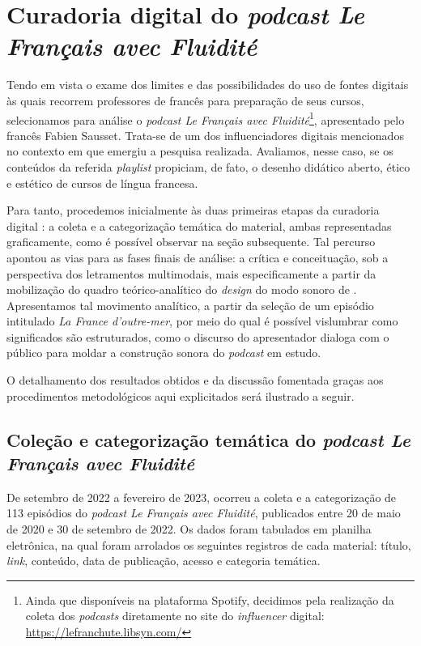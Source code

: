 \documentclass[portuguese]{textolivre}
\begin{document}
\section{Curadoria digital do \textit{podcast Le Français avec Fluidité}}\label{sec-normas}
Tendo em vista o exame dos limites e das possibilidades do uso de fontes digitais às quais recorrem professores de francês para preparação de seus cursos, selecionamos para análise o \textit{podcast Le Français avec Fluidité}\footnote{Ainda que disponíveis na plataforma Spotify, decidimos pela realização da coleta dos \textit{podcasts} diretamente no site do \textit{influencer} digital: \url{https://lefranchute.libsyn.com/}}, apresentado pelo francês Fabien Sausset. Trata-se de um dos influenciadores digitais mencionados no contexto em que emergiu a pesquisa realizada. Avaliamos, nesse caso, se os conteúdos da referida \textit{playlist} propiciam, de fato, o desenho didático aberto, ético e estético \cite{rocha_moocs_2019} de cursos de língua francesa.

Para tanto, procedemos inicialmente às duas primeiras etapas da curadoria digital \cite{deschaine_five_2015}: a coleta e a categorização temática do material, ambas representadas graficamente, como é possível observar na seção subsequente. Tal percurso apontou as vias para as fases finais de análise: a crítica e conceituação, sob a perspectiva dos letramentos multimodais, mais especificamente a partir da mobilização do quadro teórico-analítico do \textit{design} do modo sonoro de \textcite{kalantzis_letramentos_2020}. Apresentamos tal movimento analítico, a partir da seleção de um episódio intitulado \textit{La France d’outre-mer}, por meio do qual é possível vislumbrar como significados são estruturados, como o discurso do apresentador dialoga com o público para moldar a construção sonora do \textit{podcast} em estudo.

O detalhamento dos resultados obtidos e da discussão fomentada graças aos procedimentos metodológicos aqui explicitados será ilustrado a seguir.


\subsection{Coleção e categorização temática do \textit{podcast Le Français avec Fluidité}}\label{sec-conduta}
De setembro de 2022 a fevereiro de 2023, ocorreu a coleta e a categorização de 113 episódios do \textit{podcast Le Français avec Fluidité}, publicados entre 20 de maio de 2020 e 30 de setembro de 2022. Os dados foram tabulados em planilha eletrônica, na qual foram arrolados os seguintes registros de cada material: título, \textit{link}, conteúdo, data de publicação, acesso e categoria temática. 
\end{document}
